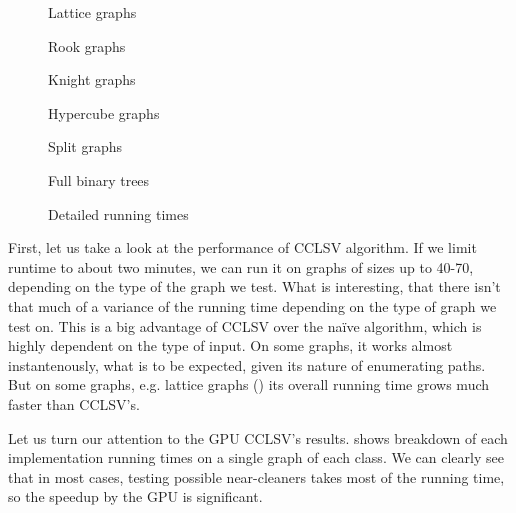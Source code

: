 \begin{figure}
  \centering
  
  \caption{Lattice graphs}
  \label{plot:gridLines}
\end{figure}

\begin{figure}
  \centering
  
  \caption{Rook graphs}
  \label{plot:rookLines}
\end{figure}

\begin{figure}
  \centering
  
  \caption{Knight graphs}
  \label{plot:knightLines}
\end{figure}

\begin{figure}
  \centering
  
  \caption{Hypercube graphs}
  \label{plot:hypercubeLines}
\end{figure}

\begin{figure}
  \centering
  
  \caption{Split graphs}
  \label{plot:splitLines}
\end{figure}

\begin{figure}
  \centering
  
  \caption{Full binary trees}
  \label{plot:splitLines}
\end{figure}

\begin{figure}
  \centering
  
  \caption{Detailed running times}
  \label{plot:perfDetailed}
\end{figure}

First, let us take a look at the performance of CCLSV algorithm. If we limit runtime to about two minutes, we can run it on graphs of sizes up to 40-70, depending on the type of the graph we test. What is interesting, that there isn't that much of a variance of the running time depending on the type of graph we test on. This is a big advantage of CCLSV over the na\"ive algorithm, which is highly dependent on the type of input. On some graphs, it works almost instantenously, what is to be expected, given its nature of enumerating paths. But on some graphs, e.g. lattice graphs () its overall running time grows much faster than CCLSV's.

Let us turn our attention to the GPU CCLSV's results.  shows breakdown of each implementation running times on a single graph of each class. We can clearly see that in most cases, testing possible near-cleaners takes most of the running time, so the speedup by the GPU is significant. 

